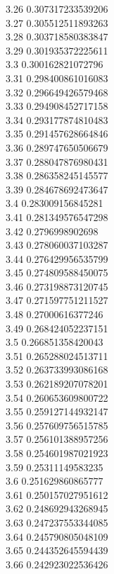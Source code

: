 {3.26	0.307317233539206\\
3.27	0.305512511893263\\
3.28	0.303718580383847\\
3.29	0.301935372225611\\
3.3	0.300162821072796\\
3.31	0.298400861016083\\
3.32	0.296649426579468\\
3.33	0.294908452717158\\
3.34	0.293177874810483\\
3.35	0.291457628664846\\
3.36	0.289747650506679\\
3.37	0.288047876980431\\
3.38	0.286358245145577\\
3.39	0.284678692473647\\
3.4	0.283009156845281\\
3.41	0.281349576547298\\
3.42	0.2796998902698\\
3.43	0.278060037103287\\
3.44	0.276429956535799\\
3.45	0.274809588450075\\
3.46	0.273198873120745\\
3.47	0.271597751211527\\
3.48	0.27000616377246\\
3.49	0.268424052237151\\
3.5	0.266851358420043\\
3.51	0.265288024513711\\
3.52	0.263733993086168\\
3.53	0.262189207078201\\
3.54	0.260653609800722\\
3.55	0.259127144932147\\
3.56	0.257609756515785\\
3.57	0.256101388957256\\
3.58	0.254601987021923\\
3.59	0.25311149583235\\
3.6	0.251629860865777\\
3.61	0.250157027951612\\
3.62	0.248692943268945\\
3.63	0.247237553344085\\
3.64	0.245790805048109\\
3.65	0.244352645594439\\
3.66	0.242923022536426\\
}
